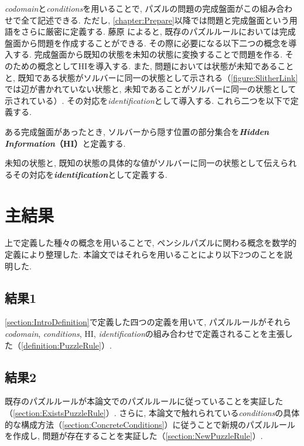\textit{codomain}と\textit{conditions}を用いることで, パズルの問題の完成盤面がこの組み合わせで全て記述できる. ただし, \cref{chapter:Prepare}以降では問題と完成盤面という用語をさらに厳密に定義する. 藤原 \cite{Fujiwara2022}によると, 既存のパズルルールにおいては完成盤面から問題を作成することができる. その際に必要になる以下二つの概念を導入する. 完成盤面から既知の状態を未知の状態に変換することで問題を作る. そのための概念としてHIを導入する. また, 問題においては状態が未知であることと, 既知である状態がソルバーに同一の状態として示される（\cref{figure:SlitherLink}では辺が書かれていない状態と, 未知であることがソルバーに同一の状態として示されている）. その対応を\textit{identification}として導入する. これら二つを以下で定義する.
\begin{definition}
  ある完成盤面があったとき, ソルバーから隠す位置の部分集合を\textbf{\textit{Hidden Information}（HI）}と定義する.
\end{definition}
\begin{definition}
  未知の状態と, 既知の状態の具体的な値がソルバーに同一の状態として伝えられるその対応を\textbf{\textit{identification}}として定義する.
\end{definition}

\section{主結果}
上で定義した種々の概念を用いることで, ペンシルパズルに関わる概念を数学的定義により整理した. 本論文ではそれらを用いることにより以下2つのことを説明した.
\subsection*{結果1}
\cref{section:IntroDefinition}で定義した四つの定義を用いて, パズルルールがそれら\textit{codomain}, \textit{conditions}, HI, \textit{identification}の組み合わせで定義されることを主張した（\cref{definition:PuzzleRule}）.

\subsection*{結果2}
既存のパズルルールが本論文でのパズルルールに従っていることを実証した（\cref{section:ExistsPuzzleRule}）.
さらに, 本論文で触れられている\textit{conditions}の具体的な構成方法（\cref{section:ConcreteConditions}）に従うことで新規のパズルルールを作成し, 問題が存在することを実証した（\cref{section:NewPuzzleRule}）.


